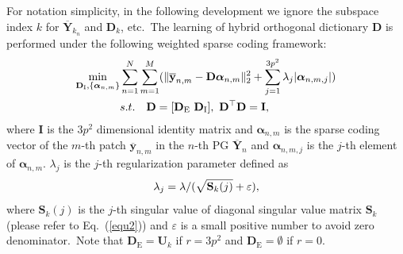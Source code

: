 \documentclass[10pt,twocolumn,letterpaper]{article}
\begin{document}
For notation simplicity, in the following development we ignore the subspace index $k$ for $\mathbf{\overline{Y}}_{k_{n}}$ and $\mathbf{D}_{k}$, etc.\ The learning of hybrid orthogonal dictionary $\mathbf{D}$ is performed under the following weighted sparse coding
framework:
\vspace{-3mm}
\begin{equation}\label{equ4}\vspace{-3mm}
\begin{split}
\min_{\mathbf{D}_{\text{I}},\{\bm{\alpha}_{n,m}\}}
&\sum_{n=1}^{N}\sum_{m=1}^{M}(\|\mathbf{\overline{y}}_{n,m}-\mathbf{D}\bm{\alpha}_{n,m}\|_{2}^{2}+\sum_{j=1}^{3p^{2}}\lambda_{j}|\bm{\alpha}_{n,m,j}|)
\\
&
s.t.
\quad
\mathbf{D}=[\mathbf{D}_{\text{E}}\ \mathbf{D}_{\text{I}}],\ \mathbf{D}^{\top}\mathbf{D} = \mathbf{I},
\end{split}
\end{equation}
where $\mathbf{I}$ is the $3p^{2}$ dimensional identity matrix and $\bm{\alpha}_{n,m}$ is the sparse coding vector of the $m$-th patch $\mathbf{\overline{y}}_{n,m}$ in the $n$-th PG $\mathbf{\overline{Y}}_{n}$ and $\bm{\alpha}_{n,m,j}$ is the $j$-th element of $\bm{\alpha}_{n,m}$. $\lambda_{j}$ is the $j$-th regularization parameter defined as
\vspace{-1mm}
\begin{equation}\label{equ5}\vspace{-1mm}
\lambda_{j} = \lambda/(\sqrt{\mathbf{S}_{k}(j)}+\varepsilon),
\end{equation}
where $\mathbf{S}_{k}(j)$ is the $j$-th singular value of diagonal singular value matrix $\mathbf{S}_{k}$ (please refer to Eq.\ (\ref{equ2})) and $\varepsilon$ is a small positive number to avoid zero denominator.\ Note that $\mathbf{D}_{\text{E}}=\mathbf{U}_{k}$ if $r=3p^{2}$ and $\mathbf{D}_{\text{E}}=\emptyset$ if $r=0$.

\end{document}
